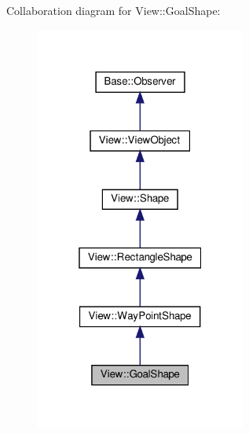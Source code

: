 Collaboration diagram for View\+:\+:Goal\+Shape\+:
\nopagebreak
\begin{figure}[H]
\begin{center}
\leavevmode
\includegraphics[width=196pt]{class_view_1_1_goal_shape__coll__graph}
\end{center}
\end{figure}
